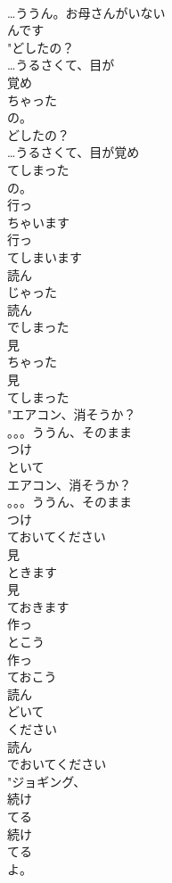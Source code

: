 \documentclass[8pt]{extreport}
\begin{document}
\begin{CJK}{UTF8}{min}
\\	…ううん。お母さんがいない
\\	んです
\\	"どしたの？
\\	…うるさくて、目が
\\	覚め
\\	ちゃった
\\	の。
\\	どしたの？
\\	…うるさくて、目が覚め
\\	てしまった
\\	の。
\\	行っ
\\	ちゃいます
\\	行っ
\\	てしまいます
\\	読ん
\\	じゃった
\\	読ん
\\	でしまった
\\	見
\\	ちゃった
\\	見
\\	てしまった
\\	"エアコン、消そうか？
\\	。。。ううん、そのまま
\\	つけ
\\	といて
\\	エアコン、消そうか？
\\	。。。ううん、そのまま
\\	つけ
\\	ておいてください
\\	見
\\	ときます
\\	見
\\	ておきます
\\	作っ
\\	とこう
\\	作っ
\\	ておこう
\\	読ん
\\	どいて
\\	ください
\\	読ん
\\	でおいてください
\\	"ジョギング、
\\	続け
\\	てる
\\	続け
\\	てる
\\	よ。

\end{CJK}
\end{document}
